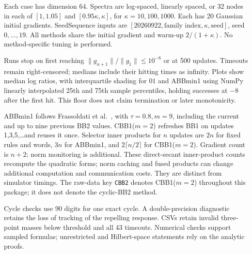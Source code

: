 Each case has dimension 64. Spectra are log-spaced, linearly spaced, or 32 nodes in each of $[1,1.05]$ and $[0.95\kappa,\kappa]$, for $\kappa=10,100,1000$. Each has 20 Gaussian initial gradients. SeedSequence inputs are $[20260922,\text{family index},\kappa,\text{seed}]$, seed $0,\ldots,19$. All methods share the initial gradient and warm-up $2/(1+\kappa)$. No method-specific tuning is performed.

Runs stop on first reaching $\|g_{n+1}\|/\|g_1\|\le10^{-8}$ or at 500 updates. Timeouts remain right-censored; medians include their hitting times as infinity. Plots show median log ratios, with interquartile shading for $01$ and ABBmin1 using NumPy linearly interpolated 25th and 75th sample percentiles, holding successes at $-8$ after the first hit. This floor does not claim termination or later monotonicity.

ABBmin1 follows Frassoldati et al.~\cite[eq.~(14)]{FrassoldatiZanniZanghirati2008}, with $\tau=0.8,m=9$, including the current and up to nine previous BB2 values. CBB1($m=2$) refreshes BB1 on updates 1,3,5,\ldots and reuses it once. Selector inner products for $n$ updates are $2n$ for fixed rules and words, $3n$ for ABBmin1, and $2\lceil n/2\rceil$ for CBB1($m=2$). Gradient count is $n+2$; norm monitoring is additional. These direct-secant inner-product counts recompute the quadratic forms; norm caching and fused products can change additional computation and communication costs. They are distinct from simulator timings. The raw-data key \texttt{CBB2} denotes CBB1($m=2$) throughout this package; it does not denote the cyclic-BB2 method.

Cycle checks use 90 digits for one exact cycle. A double-precision diagnostic retains the loss of tracking of the repelling response. CSVs retain invalid three-point masses below threshold and all 43 timeouts. Numerical checks support sampled formulas; unrestricted and Hilbert-space statements rely on the analytic proofs.
